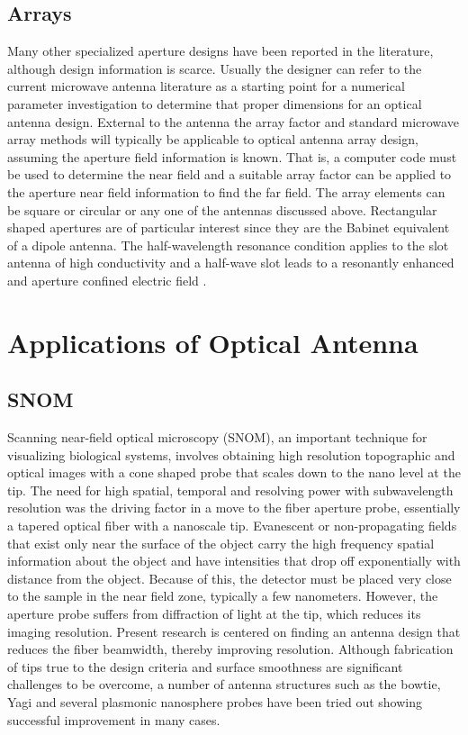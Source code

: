 \documentclass[11pt]{article}
\begin{document}
\subsection{Arrays}
%
Many other specialized aperture designs have been reported in the literature, although design information is scarce. Usually the designer can refer to the current microwave antenna literature as a starting point for a numerical parameter investigation to determine that proper dimensions for an optical antenna design. External to the antenna the array factor and standard microwave array methods will typically be applicable to optical antenna array design, assuming the aperture field information is known. That is, a computer code must be used to determine the near field and a suitable array factor can be applied to the aperture near field information to find the far field. The array elements can be square or circular or any one of the antennas discussed above. Rectangular shaped apertures are of particular interest since they are the Babinet equivalent of a dipole antenna. The half-wavelength resonance condition applies to the slot antenna of high conductivity and a half-wave slot leads to
a resonantly enhanced and aperture confined electric field \cite{Park2009}.
\section{Applications of Optical Antenna}
\subsection{SNOM}
%
Scanning near-field optical microscopy (SNOM), an important technique for visualizing biological systems, involves obtaining high resolution topographic and optical images with a cone shaped probe that scales down to the nano level at the tip. The need for high spatial, temporal and resolving power with subwavelength resolution was the driving factor in a move to the fiber aperture probe, essentially a tapered optical fiber with a nanoscale tip.  Evanescent or non-propagating fields that exist only near the surface of the object carry the high frequency spatial information about the object and have intensities that drop off exponentially with distance from the object. Because of this, the detector must be placed very close to the sample in the near field zone, typically a few nanometers. However, the aperture probe suffers from diffraction of light at the tip, which reduces its imaging resolution. Present research is centered on finding an antenna design that reduces the fiber beamwidth, thereby improving resolution. Although fabrication of tips true to the design criteria and surface smoothness are significant challenges to be overcome, a number of antenna structures such as the bowtie, Yagi and several plasmonic nanosphere probes have been tried out showing successful improvement in many cases.
\end{document}
